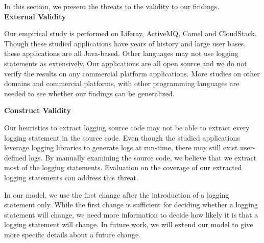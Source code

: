 In this section, we present the threats to the validity to our findings. \\


\noindent \textbf{External Validity}

Our empirical study is performed on Liferay, ActiveMQ, Camel and CloudStack. Though these studied applications have years of history and large user bases, these applications are all Java-based. Other languages may not use logging statements as extensively. Our applications are all open source and we do not verify the results on any commercial platform applications. More studies on other domains and commercial platforms, with other programming languages are needed to see whether our findings can be generalized. 



\noindent \textbf{Construct Validity}


Our heuristics to extract logging source code may not be able to extract every logging statement in the source code. Even though the studied applications leverage logging libraries to generate logs at run-time, there may still exist user-defined logs. By manually examining the source code, we believe that we extract most of the logging statements. Evaluation on the coverage of our extracted logging statements can address this threat.

In our model, we use the first change after the introduction of a logging statement only. While the first change is sufficient for deciding whether a logging statement will change, we need more information to decide how likely it is that a logging statement will change. In future work, we will extend our model to give more specific details about a future change.




